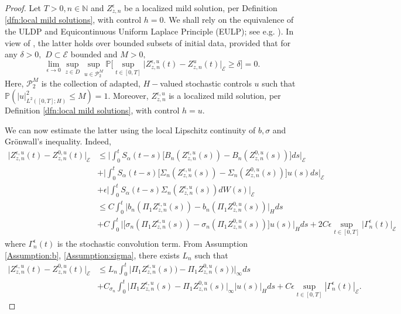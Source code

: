 \documentclass[10pt, reqno]{amsart}
\newcommand{\N}{\mathbb{N}}
\newcommand{\pr}{\mathbb{P}}
\newcommand{\e}{\mathcal{E}}
\theoremstyle{definition}
\numberwithin{lem}{section}
\numberwithin{cor}{section}
\numberwithin{prop}{section}
\numberwithin{thm}{section}
\numberwithin{dfn}{section}
\begin{document}
              \begin{proof} Let $T>0, n\in\N$   
              and $Z^\epsilon_{z,n}$ be a localized mild solution, per Definition \ref{dfn:local mild solutions}, with control $h=0.$ We shall rely on the equivalence of the ULDP and Equicontinuous Uniform Laplace Principle (EULP); see e.g. \cite[Theorem 2.9]{salins2019equivalences}).  In view of  \cite[Theorem 2.12]{salins2019equivalences}, the latter holds over bounded subsets of initial data, provided that for any $\delta>0,$ $D\subset\e$ bounded and $M>0,$
    	   \begin{equation}
    	       \label{eq:EULPsufficient}
            \lim_{\epsilon\to 0}\sup_{z\in D}\sup_{u\in\mathcal{P}_2^M}\pr\bigg[\sup_{t\in[0,T]}\big|Z_{z, n}^{\epsilon,u}(t)-Z_{z, n}^{u}(t)\big|_{\e}\geq \delta \bigg]=0.
    	   \end{equation}
  Here, $\mathcal{P}_2^M$ is the collection of adapted, $H-$valued stochastic controls $u$ such that $\pr( |u|^2_{L^2([0,T];H)}\leq M)=1.$ Moreover, $Z^{\epsilon,u}_{z,n}$ is a localized mild solution, per Definition \ref{dfn:local mild solutions}, with control $h=u.$ 


   \noindent We can now estimate the latter using the local Lipschitz continuity of $b,\sigma$ and Gr\"onwall's inequality. Indeed,     	   
    	   \begin{equation*}
    	   \begin{aligned}
\big|Z_{z,n}^{\epsilon,u}(t)-Z_{z,n}^{0,u}(t)\big|_{\e}&\leq \bigg|\int_{0}^{t}S_{\alpha}(t-s)\big[B_n(Z_{z,n}^{\epsilon,u}(s))-B_n(Z_{z,n}^{0,u}(s))\big]ds\bigg|_{\e}\\&+ \bigg|\int_{0}^{t}S_{\alpha}(t-s)\big[\Sigma_n(Z_{z,n}^{\epsilon,u}(s))-\Sigma_n(Z_{z,n}^{0,u}(s))\big]u(s)ds\bigg|_{\e}\\&
+\epsilon\bigg|\int_{0}^{t}S_{\alpha}(t-s)\Sigma_n(Z_{z,n}^{\epsilon,u}(s))dW(s)\bigg|_{\e}\\&\leq C\int_{0}^{t}\big|b_{n}(\Pi_1Z_{z,n}^{\epsilon,u}(s))-b_{n}(\Pi_1Z_{z,n}^{0,u}(s))\big|_{H}ds\\&
+C\int_{0}^{t}\big|\big[\sigma_n(\Pi_1Z_{z,n}^{\epsilon,u}(s))-\sigma_n(\Pi_1Z_{z,n}^{0,u}(s))\big]u(s)\big|_{H}ds+2C\epsilon\sup_{t\in[0,T]}\big|\Gamma_{n}^\epsilon(t)\big|_\e
    	   \end{aligned}
    	   \end{equation*}
where $\Gamma^\epsilon_{n}(t)$ is the stochastic convolution term.
 From Assumption \ref{Assumption:b}, \ref{Assumption:sigma}, there exists $L_{n}$ such that 
\begin{equation*}
\begin{aligned}
\big|Z_{z,n}^{\epsilon,u}(t)-Z_{z,n}^{0,u}(t)\big|_{\e}&\leq L_n\int_{0}^{t}\big|\Pi_1Z_{z,n}^{\epsilon,u}(s))-\Pi_1Z_{z,n}^{0,u}(s))\big|_{\infty}ds\\&
+C_{\sigma_n}\int_{0}^{t}\big|\Pi_1Z_{z,n}^{\epsilon,u}(s)-\Pi_1Z_{z,n}^{0,u}(s)\big|_{\infty}|u(s)|_{H}ds+C\epsilon\sup_{t\in[0,T]}|\Gamma_{n}^\epsilon(t)|_\e.
\end{aligned}
\end{equation*}


\end{proof}
\end{document}
